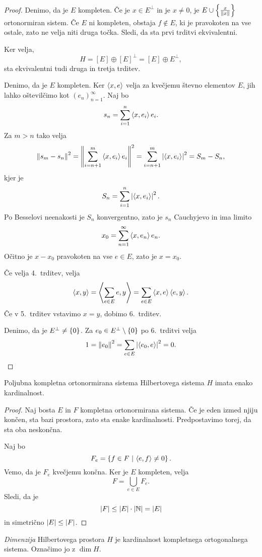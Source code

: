 \begin{proof}
Denimo, da je $E$ kompleten. Če je $x \in E^\bot$ in je $x \ne 0$,
je $E \cup \left\{\frac{x}{\left\lVert x\right\rVert}\right\}$ ortonormiran sistem. Če $E$ ni
kompleten, obstaja $f \not \in E$, ki je pravokoten na vse ostale,
zato ne velja niti druga točka. Sledi, da sta prvi trditvi
ekvivalentni.

Ker velja,
\[
H = [E] \oplus [E]^\bot = [E] \oplus E^\bot,
\]
sta ekvivalentni tudi druga in tretja trditev.

Denimo, da je $E$ kompleten. Ker $\left\langle x,e\right\rangle$ velja za kvečjemu
števno elementov $E$, jih lahko oštevilčimo kot
$(e_n)_{n=1}^\infty$. Naj bo
\[
s_n = \sum_{i=1}^n \left\langle x, e_i\right\rangle e_i.
\]
Za $m>n$ tako velja
\[
\left\lVert s_m - s_n\right\rVert^2 = \left\lVert \sum_{i=n+1}^m \left\langle x, e_i\right\rangle e_i\right\rVert^2 =
\sum_{i=n+1}^m \left\lvert \left\langle x, e_i\right\rangle\right\rvert^2 = S_m - S_n,
\]
kjer je
\[
S_n = \sum_{i=1}^n \left\lvert \left\langle x,e_i\right\rangle\right\rvert^2.
\]
Po Besselovi neenakosti je $S_n$ konvergentno, zato je $s_n$
Cauchyjevo in ima limito
\[
x_0 = \sum_{n=1}^\infty \left\langle x, e_n\right\rangle e_n.
\]
Očitno je $x - x_0$ pravokoten na vse $e \in E$, zato je $x = x_0$.

Če velja 4.~trditev, velja
\[
\left\langle x,y\right\rangle = \left\langle \sum_{e \in E} e, y\right\rangle =
\sum_{e \in E} \left\langle x,e\right\rangle \left\langle e, y\right\rangle.
\]
Če v 5.~trditev vstavimo $x=y$, dobimo 6.~trditev.

Denimo, da je $E^\bot \ne \left\{0\right\}$. Za
$e_0 \in E^\bot \setminus \left\{0\right\}$ po 6.~trditvi velja
\[
1 = \left\lVert e_0\right\rVert^2 = \sum_{e \in E} \left\lvert \left\langle e_0, e\right\rangle\right\rvert^2 = 0.
\qedhere
\]
\end{proof}

\begin{trditev}
Poljubna kompletna ortonormirana sistema Hilbertovega sistema $H$
imata enako kardinalnost.
\end{trditev}

\begin{proof}
Naj bosta $E$ in $F$ kompletna ortonormirana sistema. Če je eden
izmed njiju končen, sta bazi prostora, zato sta enake
kardinalnosti. Predpostavimo torej, da sta oba neskončna.

Naj bo
\[
F_e = \left\{f \in F~\middle\vert~\left\langle e,f\right\rangle \ne 0\right\}.
\]
Vemo, da je $F_e$ kvečjemu končna. Ker je $E$ kompleten, velja
\[
F = \bigcup_{e \in E} F_e.
\]
Sledi, da je
\[
\left\lvert F\right\rvert \leq \left\lvert E\right\rvert \cdot \left\lvert \mathbb{N}\right\rvert = \left\lvert E\right\rvert
\]
in simetrično $\left\lvert E\right\rvert \leq \left\lvert F\right\rvert$.
\end{proof}

\begin{definicija}
\emph{Dimenzija} Hilbertovega
prostora $H$ je kardinalnost kompletnega ortogonalnega sistema.
Označimo jo z $\dim H$.
\end{definicija}

